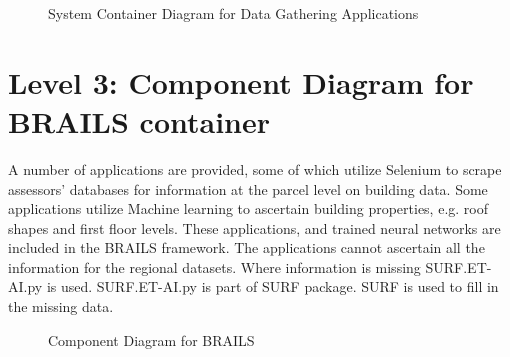 \begin{figure}[!htbp]
  \caption{System Container Diagram for Data Gathering Applications}
  \label{fig:containerData}
\end{figure}

 
\section{Level 3: Component Diagram for BRAILS container}

A number of applications are provided, some of which utilize Selenium to scrape assessors’ databases for information at the parcel level on building data. Some applications utilize Machine learning to ascertain building properties, e.g. roof shapes and first floor levels. These applications, and trained neural networks are included in the BRAILS framework. The applications cannot ascertain all the information for the regional datasets. Where information is missing SURF.ET-AI.py is used. SURF.ET-AI.py is part of SURF package. SURF is used to fill in the missing data.
 
\begin{figure}[!htbp]
  \caption{Component Diagram for BRAILS}
  \label{fig:componentBRAILS}
\end{figure}
